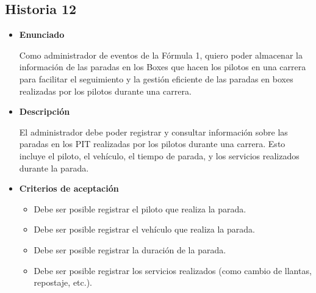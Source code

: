 \documentclass{article}
\begin{document}
	\subsection{Historia 12}
	\begin{itemize}
		
		\item \large{\textbf{Enunciado}}
		\begin{description}
			Como administrador de eventos de la Fórmula 1, quiero poder almacenar la información de las paradas en los Boxes que hacen los pilotos en una carrera para facilitar el seguimiento y la gestión eficiente de las paradas en boxes realizadas por los pilotos durante una carrera.
			
		\end{description}
		
		\item \large{\textbf{Descripción}}
		\begin{description}
			El administrador debe poder registrar y consultar información sobre las paradas en los PIT realizadas por los pilotos durante una carrera. Esto incluye el piloto, el vehículo, el tiempo de parada, y los servicios realizados durante la parada.
			
		\end{description}
		
		\item \large{\textbf{Criterios de aceptación}}
		\begin{itemize}
			\item Debe ser posible registrar el piloto que realiza la parada.
			\item Debe ser posible registrar el vehículo que realiza la parada. 
			\item Debe ser posible registrar la duración de la parada.
			\item Debe ser posible registrar los servicios realizados (como cambio de llantas, repostaje, etc.).
			
		\end{itemize}
		
	\end{itemize}
	
\end{document}
